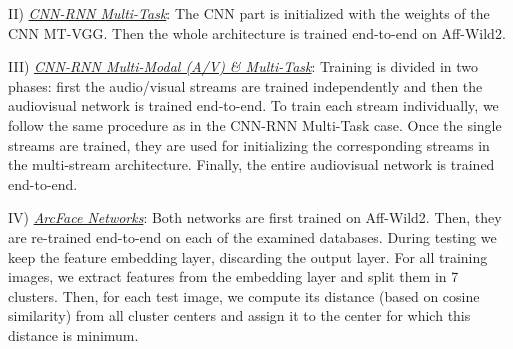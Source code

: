 \documentclass{bmvc2k}
\begin{document}
\noindent II) \underline{\textit{CNN-RNN Multi-Task}}: The CNN part is initialized with the weights of the CNN MT-VGG. Then the whole architecture is trained end-to-end on Aff-Wild2. 

\noindent III) \underline{\textit{CNN-RNN Multi-Modal (A/V) \& Multi-Task}}: Training is divided in two phases: first the audio/visual streams are trained independently and then the audiovisual network is trained end-to-end. To train each stream individually, we follow the same procedure as in the CNN-RNN Multi-Task case. Once the single streams are trained, they are used for initializing the corresponding streams in the multi-stream architecture. Finally, the entire audiovisual network is trained end-to-end. 

\noindent IV) \underline{\textit{ArcFace Networks}}: Both networks are first trained on Aff-Wild2. Then, they are re-trained end-to-end on each of the examined databases. During testing we keep the feature embedding layer, discarding the output layer. For all training images, we extract features from the embedding layer and split them in 7 clusters. Then, for each test image, we compute its distance (based on cosine similarity) from all cluster centers and assign it to the center for which this distance is minimum. 



\begin{table}[h]
\caption{Network Configurations: ST= Single Task, MT=Multi-Task} 
\label{hyper}
\centering
{}
\end{table}
\end{document}
